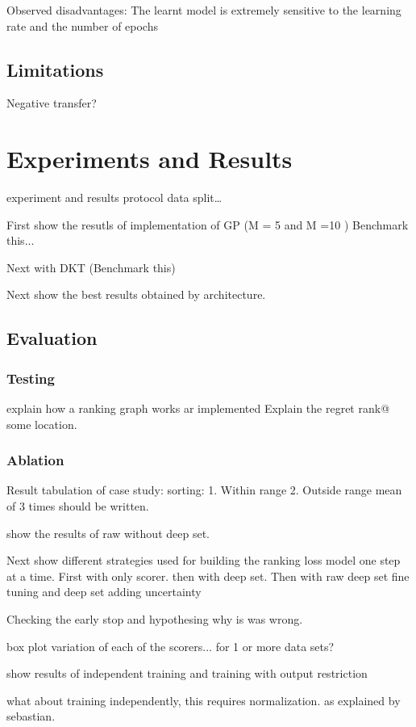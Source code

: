 \documentclass[11pt]{report}
\begin{document}
Observed disadvantages:
    The learnt model is extremely sensitive to the learning rate and the number of epochs
    
\section{Limitations}
Negative transfer?

\chapter{Experiments and Results}

experiment and results
protocol
data split…

First show the resutls of implementation of GP (M = 5 and M =10 )
Benchmark this...

Next with DKT (Benchmark this)

Next show the best results obtained by architecture.

\section{Evaluation}
\subsection{Testing}
explain how a ranking graph works ar implemented
Explain the regret rank@ some location.

\subsection{Ablation}

Result tabulation of case study: sorting:
1.  Within range
2.   Outside range 
mean of 3 times should be written.

show the results of raw without deep set.

Next show different strategies used for building the ranking loss model one step at a time.
First with only scorer.
then with deep set.
Then with raw deep set
fine tuning and deep set
adding uncertainty

Checking the early stop and hypothesing why is was wrong.

box plot variation of each of the scorers... for 1 or more data sets?

show results of independent training and training with output restriction

what about training independently,   this requires normalization. 
as explained by sebastian.
\end{document}
